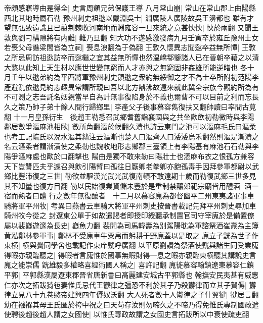 帝頗感寤導由是得全|{
	史言周顗兄弟保護王導}
八月常山崩|{
	常山在常山郡上曲陽縣西北其地時屬石勒}
豫州刺史祖逖以戴淵吳士|{
	淵廣陵人廣陵故吳王濞都也}
雖有才望無弘致遠識且已翦荆棘收河南地而淵雍容一旦來統之意甚怏怏|{
	怏於兩翻}
又聞王敦與劉刁構隙將有内難|{
	難乃旦翻}
知大功不遂感激發病九月壬寅卒於雍丘豫州士女若喪父母譙梁間皆為立祠|{
	喪息浪翻為于偽翻}
王敦久懷異志聞逖卒益無所憚|{
	王敦之所忌周訪祖逖訪卒而逖繼之宜其益無所憚也然温嶠郗鑒諸人已在晉朝卒藉之以清大憝以此知上天生材以應世世變無窮而人才亦與之無窮固非姦雄所能逆睹也}
冬十月壬午以逖弟約為平西將軍豫州刺史領逖之衆約無綏御之才不為士卒所附初范陽李產避亂依逖見約志趣異常謂所親曰吾以北方鼎沸故遠來就此冀全宗族今觀約所為有不可測之志吾託名姻親當早自為計無事復陷身於不義也爾曹不可以目前之利而忘長久之策乃帥子弟十餘人間行歸鄉里|{
	李產父子後事慕容雋復扶又翻帥讀曰率間古莧翻}
十一月皇孫衍生　後趙王勒悉召武鄉耆舊詣襄國與之共坐歡飲初勒微時與李陽鄰居數爭漚麻池相歐|{
	數所角翻漚於候翻久漬也詩云東門之池可以漚麻毛氏曰漚柔也考工記㡆氏以涗水漚其絲注云漚漸也楚人曰漚齊人曰涹涹烏禾翻然則漚是漸漬之名云漚柔者謂漸漬使之柔勒也魏收地形志鄉郡三臺領上有李陽基有麻池石石勒與李陽爭漚麻處也歐於口翻擊也}
陽由是獨不敢來勒曰陽壯士也漚麻布衣之恨孤方兼容天下豈讐匹夫乎遽召與飲引陽臂曰孤往日厭卿老拳卿亦飽孤毒手因拜參軍都尉以武鄉比豐沛復之三世|{
	勒欲並驅漢光武光武復南頓不敢遠期十歲而勒復武鄉三世多見其不知量也復方目翻}
勒以民始復業資儲未豐於是重制禁釀郊祀宗廟皆用醴酒|{
	酒一宿而熟者曰醴}
行之數年無復釀者　十二月以慕容廆為都督幽平二州東夷諸軍事車騎將軍平州牧|{
	考異曰燕書云車騎大將軍平州刺史按晉書載記先拜平州刺史尋加車騎州牧今從之}
封遼東公單于如故遣謁者即授印綬聽承制置官司守宰廆於是備置僚屬以裴嶷遊邃為長史|{
	嶷魚力翻}
裴開為司馬韓壽為别駕陽耽為軍諮祭酒崔燾為主簿黄泓鄭林參軍事|{
	鄭林不受廆車牛粟帛而躬耕于野廆蓋以是取之}
廆立子皝為世子作東横|{
	横與黌同學舍也載記作東庠皝呼廣翻}
以平原劉讚為祭酒使皝與諸生同受業廆得暇亦親臨聽之|{
	得暇者言廆惟於國事無暇財得一息之暇亦親臨東横聽其講說史言廆之能崇儒}
皝雄毅多權略喜經術國人稱之|{
	喜許記翻}
廆徙慕容翰鎮遼東慕容仁鎮平郭|{
	平郭縣漢屬遼東郡晉省唐新書曰高麗建安城古平郭縣也}
翰撫安民夷甚有威惠仁亦次之拓跋猗㐌妻惟氏忌代王鬱律之彊恐不利於其子乃殺欝律而立其子賀傉|{
	欝律立見八十九卷愍帝建興四年傉奴沃翻}
大人死者數十人鬱律之子什翼犍|{
	犍居言翻}
幼在襁褓其母王氏匿於袴中祝之曰天苟存汝則勿啼久之不啼乃得免惟氏專制國政遣使聘後趙後趙人謂之女國使|{
	以惟氏專政故謂之女國史言拓跋所以中衰使疏吏翻}


